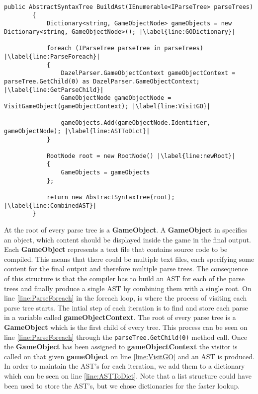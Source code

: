 \begin{lstlisting}[caption={The BuildAst method}, label={lst:BuildAstMethod},escapechar=|]
    public AbstractSyntaxTree BuildAst(IEnumerable<IParseTree> parseTrees)
        {
            Dictionary<string, GameObjectNode> gameObjects = new Dictionary<string, GameObjectNode>(); |\label{line:GODictionary}|
            
            foreach (IParseTree parseTree in parseTrees) |\label{line:ParseForeach}|
            {
                DazelParser.GameObjectContext gameObjectContext = parseTree.GetChild(0) as DazelParser.GameObjectContext; |\label{line:GetParseChild}|
                GameObjectNode gameObjectNode = VisitGameObject(gameObjectContext); |\label{line:VisitGO}|
                
                gameObjects.Add(gameObjectNode.Identifier, gameObjectNode); |\label{line:ASTToDict}|
            }

            RootNode root = new RootNode() |\label{line:newRoot}|
            {
                GameObjects = gameObjects
            };
            
            return new AbstractSyntaxTree(root); |\label{line:CombinedAST}|
        }
\end{lstlisting}

At the root of every parse tree is a \textbf{GameObject}. A \textbf{GameObject} in \dazel{} specifies an object, which content should be displayed inside the game in the final output. Each \textbf{GameObject} represents a text file that contains source code to be compiled. This means that there could be multiple text files, each specifying some content for the final output and therefore multiple parse trees. 
The consequence of this structure is that the compiler has to build an AST for each of the parse trees and finally produce a single AST by combining them with a single root. On line \ref{line:ParseForeach} in the foreach loop, is where the process of visiting each parse tree starts. 
The intial step of each iteration is to find and store each parse in a variable called \textbf{gameObjectContext}. The root of every parse tree is a \textbf{GameObject} which is the first child of every tree. This process can be seen on line \ref{line:ParseForeach} through the \texttt{parseTree.GetChild(0)} method call.
Once the \textbf{GameObject} has been assigned to \textbf{gameObjectContext} the visitor is called on that given \textbf{gameObject} on line \ref{line:VisitGO} and an AST is produced. 
In order to maintain the AST's for each iteration, we add them to a dictionary which can be seen on line \ref{line:ASTToDict}. 
Note that a list structure could have been used to store the AST's, but we chose dictionaries for the faster lookup.

